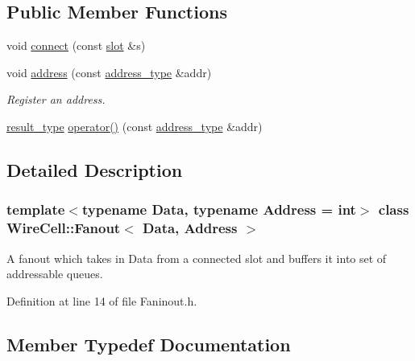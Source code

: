 \subsection*{Public Member Functions}
\begin{DoxyCompactItemize}
\item 
void \hyperlink{class_wire_cell_1_1_fanout_a9dda7047d121f8054792658dc6aba664}{connect} (const \hyperlink{class_wire_cell_1_1_fanout_aad9b77d911095ea21e611a806ee42d00}{slot} \&s)
\item 
void \hyperlink{class_wire_cell_1_1_fanout_ae47d24683d1dfb632e8e70397344e6da}{address} (const \hyperlink{class_wire_cell_1_1_fanout_ab1b06d1a80be80055b2e76ca512294c5}{address\+\_\+type} \&addr)
\begin{DoxyCompactList}\small\item\em Register an address. \end{DoxyCompactList}\item 
\hyperlink{class_wire_cell_1_1_fanout_ab2aa0c746557cf71d0454640c91ce0c5}{result\+\_\+type} \hyperlink{class_wire_cell_1_1_fanout_a162e0d8a0d078ae641140c1e62354394}{operator()} (const \hyperlink{class_wire_cell_1_1_fanout_ab1b06d1a80be80055b2e76ca512294c5}{address\+\_\+type} \&addr)
\end{DoxyCompactItemize}


\subsection{Detailed Description}
\subsubsection*{template$<$typename Data, typename Address = int$>$\newline
class Wire\+Cell\+::\+Fanout$<$ Data, Address $>$}

A fanout which takes in Data from a connected slot and buffers it into set of addressable queues. 

Definition at line 14 of file Faninout.\+h.



\subsection{Member Typedef Documentation}
\mbox{\label{class_wire_cell_1_1_fanout_ab1b06d1a80be80055b2e76ca512294c5}} 

